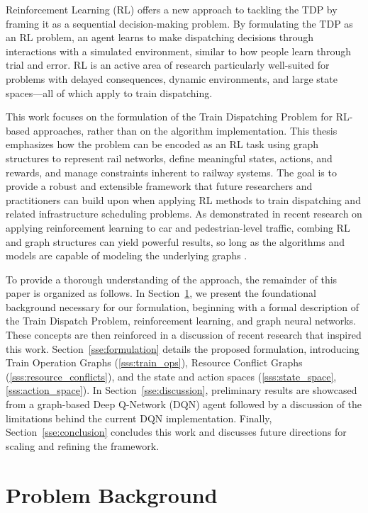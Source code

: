 \documentclass[runningheads]{llncs}
\begin{document}
Reinforcement Learning (RL) offers a new approach to tackling the TDP by framing it as a sequential decision-making problem.
By formulating the TDP as an RL problem, an agent learns to make dispatching decisions through interactions with a simulated environment, similar to how people learn through trial and error. 
RL is an active area of research particularly well-suited for problems with delayed consequences, dynamic environments, and large state spaces—all of which apply to train dispatching. 

This work focuses on the formulation of the Train Dispatching Problem for RL-based approaches, rather than on the algorithm implementation. 
This thesis emphasizes how the problem can be encoded as an RL task using graph structures to represent rail networks, define meaningful states, actions, and rewards, and manage constraints inherent to railway systems. 
The goal is to provide a robust and extensible framework that future researchers and practitioners can build upon when applying RL methods to train dispatching and related infrastructure scheduling problems.
As demonstrated in recent research on applying reinforcement learning to car and pedestrian-level traffic, combing RL and graph structures can yield powerful results, so long as the algorithms and models are capable of modeling the underlying graphs \cite{gnndrl:Devailly_2022}.

To provide a thorough understanding of the approach, the remainder of this paper is organized as follows. 
In Section~\ref{sse:background}, we present the foundational background necessary for our formulation, beginning with a formal description of the Train Dispatch Problem, reinforcement learning, and graph neural networks.
These concepts are then reinforced in a discussion of recent research that inspired this work.
Section~\ref{sse:formulation} details the proposed formulation, introducing Train Operation Graphs (\ref{sss:train_ops}), Resource Conflict Graphs (\ref{sss:resource_conflicts}), and the state and action spaces (\ref{sss:state_space}, \ref{sss:action_space}). 
In Section~\ref{sse:discussion}, preliminary results are showcased from a graph-based Deep Q-Network (DQN) agent followed by a discussion of the limitations behind the current DQN implementation.
Finally, Section~\ref{sse:conclusion} concludes this work and discusses future directions for scaling and refining the framework.



\section{Problem Background}
\label{sse:background}
\end{document}
